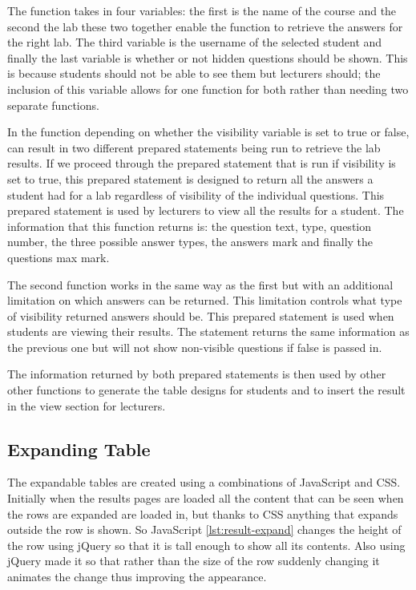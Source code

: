 \documentclass[11pt]{report}
\begin{document}
The function takes in four variables: the first is the name of the course and the second the lab these two together enable the function to retrieve the answers for the right lab. The third variable is the username of the selected student and finally the last variable is  whether or not hidden questions should be shown. This is because students should not be able to see them but lecturers should; the inclusion of this variable allows for one function for both rather than needing two separate functions.



In the function depending on whether the visibility variable is set to true or false, can result in two different prepared statements being run to retrieve the lab results. If we proceed through the prepared statement that is run if visibility is set to true, this prepared statement is designed to return all the answers a student had for a lab regardless of visibility of the individual questions. This prepared statement is used by lecturers to view all the results for a student. The information that this function returns is: the question text, type, question number, the three possible answer types, the answers mark and finally the questions max mark.

The second function works in the same way as the first but with an additional limitation on which answers can be returned. This limitation controls what type of visibility returned answers should be. This prepared statement is used when students are viewing their results. The statement returns the same information as the previous one but will not show non-visible questions if false is passed in.

The information returned by both prepared statements is then used by other other functions to generate the table designs for students and to insert the result in the view section for lecturers.



\subsection{Expanding Table}

The expandable tables are created using a combinations of JavaScript and CSS. Initially when the results pages are loaded all the content that can be seen when the rows are expanded are loaded in, but thanks to CSS anything that expands outside the row is shown. So JavaScript \ref{lst:result-expand} changes the height of the row using jQuery so that it is tall enough to show all its contents. Also using jQuery made it so that rather than the size of the row suddenly changing it animates the change thus improving the appearance.
\end{document}
